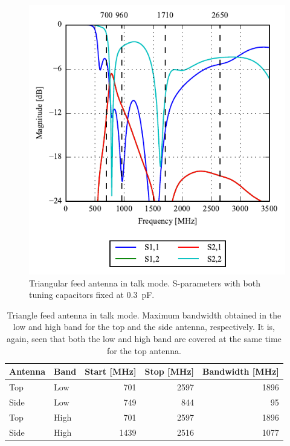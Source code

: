 \begin{figure}[htbp]
    \centering
    \includegraphics{img/tech_sol/trianglefeed/talk_mode/sparams.pdf}
    \caption{Triangular feed antenna in talk mode. S-parameters with both tuning capacitors fixed at \SI{0.3}{pF}.}
    \label{fig:triang_sparam_talk}
\end{figure}

\begin{table}[htbp]
    \centering
    \begin{tabular}{|l|l|r|r|r|}
        \hline
        Antenna & Band & Start [MHz] & Stop [MHz] & Bandwidth [MHz] \\
        \hline
        Top     & Low  & 701         & 2597       & 1896 \\
        Side    & Low  & 749         & 844        & 95   \\
        \hline
        Top     & High & 701         & 2597       & 1896 \\
        Side    & High & 1439        & 2516       & 1077 \\
        \hline
    \end{tabular}
    \caption{Triangle feed antenna in talk mode. Maximum bandwidth obtained in the low and high band for the top and the side antenna, respectively. It is, again, seen that both the low and high band are covered at the same time for the top antenna.}
    \label{tab:bw_sol2talk}
\end{table}

